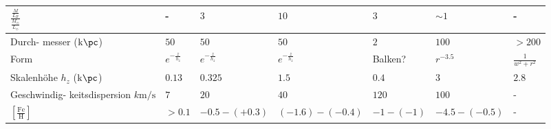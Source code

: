 \begin{itemize}
\begin{table}[H]
\begin{tabular}{p{2 cm}|p{}|p{}|p{}|p{}|p{}|p{}}
				$\frac{\frac{M}{L_B}}{\frac{M_\odot}{L_\odot}}$ & - & $\num{3}$ & $\num{10}$ & $\num{3}$ & $\sim\num{1}$ & - \\\hline
				Durch- messer ($\si{k\pc}$) & $\num{50}$ & $\num{50}$ & $\num{50}$ & $\num{2}$ & $\num{100}$ & $>\num{200}$\\\hline
				Form & $e^{-\frac{z}{h_z}}$ & $e^{-\frac{z}{h_z}}$ & $e^{-\frac{z}{h_z}}$ & Balken? & $r^{-3.5}$ & $\frac{1}{w^2+r^2}$ \\\hline
				Skalenhöhe $h_z$ ($\si{k\pc}$) & $\num{0.13}$ & $\num{0.325}$ & $\num{1.5}$ & $\num{0.4}$ & $\num{3}$ & $\num{2.8}$ \\\hline
				Geschwindig- keitsdispersion $\si{k\m\per\s}$& $\num{7}$ & $\num{20}$ & $\num{40}$ & $\num{120}$ & $\num{100}$ & - \\\hline
				$\left[\frac{\text{Fe}}{\text{H}}\right]$ & $>\num{0.1}$ & $-\num{0.5}-(+\num{0.3})$ & $(-\num{1.6})-(-\num{0.4})$ & $-\num{1}-(-\num{1})$ & $-\num{4.5}-(-\num{0.5})$ & - \\
			\end{tabular}
		\end{table}
\end{itemize}
